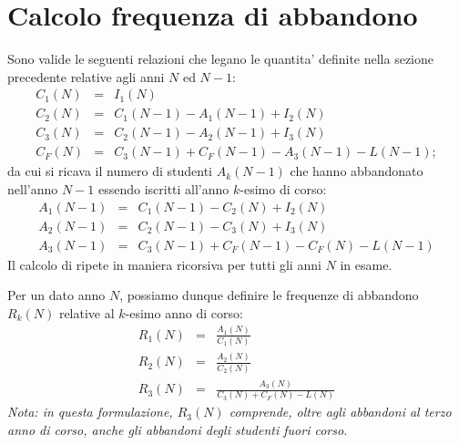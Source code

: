 \documentclass[a4paper,11pt]{article}
\begin{document}
\section{Calcolo frequenza di abbandono}

Sono valide le seguenti relazioni che legano le quantita' definite nella sezione precedente 
relative agli anni $N$ ed $N-1$:
%
\begin{eqnarray}
C_1(N) & = & I_1(N) \\
C_2(N) & = & C_1(N-1) - A_1(N-1) + I_2(N) \\
C_3(N) & = & C_2(N-1) - A_2(N-1) + I_3(N) \\
C_F(N) & = & C_3(N-1) + C_F(N-1) - A_3(N-1) - L(N-1) ;
\end{eqnarray}
%
da cui si ricava il numero di studenti $A_k(N-1)$  che hanno abbandonato 
nell'anno $N-1$ essendo iscritti all'anno $k$-esimo di corso:
%
\begin{eqnarray}
A_1(N-1) & = & C_1(N-1) - C_2(N) + I_2(N) \\
A_2(N-1) & = & C_2(N-1) - C_3(N) + I_3(N) \\
A_3(N-1) & = & C_3(N-1) + C_F(N-1) - C_F(N) - L(N-1) 
\end{eqnarray}
%
Il calcolo di ripete in maniera ricorsiva per tutti gli anni $N$ in esame.
%

Per un dato anno $N$, possiamo dunque definire 
le frequenze di abbandono $R_k(N)$ relative al $k$-esimo anno di corso:
%
\begin{eqnarray}
R_1(N) & = & \frac{A_1(N)}{C_1(N)} \\ 
R_2(N) & = & \frac{A_2(N)}{C_2(N)} \\
R_3(N) & = & \frac{A_3(N)}{C_3(N)+C_F(N)-L(N)}
\end{eqnarray}
%
{\it Nota: in questa formulazione, $R_3(N)$ comprende, oltre agli
  abbandoni al terzo anno di corso, anche gli abbandoni degli studenti fuori corso.}
\end{document}
